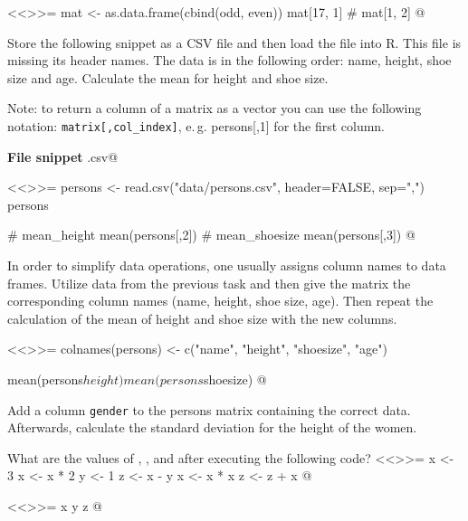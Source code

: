 \documentclass
[answers]
{exercise_sheet}
\begin{document}
\makeatletter\if@answers\begin{Answer}{1}
<<>>=
mat <- as.data.frame(cbind(odd, even))
mat[17, 1] # 
mat[1, 2]
@
\end{Answer}\fi\makeatother


\begin{Question}{3}
Store the following snippet as a CSV file and then load the file into R. This file is missing its header names. The data is in the following order: name, height, shoe size and age. Calculate the mean for height and shoe size. 

Note: to return a column of a matrix as a vector you can use the following notation: \verb|matrix[,col_index]|, e.\,g. persons[,1] for the first column.

\vspace*{0.5cm}
\textbf{File snippet} \verb@persons.csv@

\end{Question}

\makeatletter\if@answers\begin{Answer}{4}
<<>>=
persons <- read.csv("data/persons.csv", header=FALSE, sep=",")
persons

# mean_height
mean(persons[,2])
# mean_shoesize
mean(persons[,3])
@
\end{Answer}\fi\makeatother

\begin{Question}{2}
In order to simplify data operations, one usually assigns column names to data frames. Utilize data from the previous task and then give the matrix the corresponding column names (name, height, shoe size, age). Then repeat the calculation of the mean of height and shoe size with the new columns.
\end{Question}

\makeatletter\if@answers\begin{Answer}{4}
<<>>=
colnames(persons) <- c("name", "height", "shoesize", "age")

mean(persons$height)
mean(persons$shoesize)
@
\end{Answer}\fi\makeatother

\begin{Question}{2}
Add a column \verb|gender| to the persons matrix containing the correct data. Afterwards, calculate the standard deviation for the height of the women.
\end{Question}

\makeatletter\if@answers{}\fi\makeatother

\begin{Question}{1}
What are the values of \verb@x@, \verb@y@, and \verb@z@ after executing the following code?
<<>>=
x <- 3
x <- x * 2
y <- 1
z <- x - y
x <- x * x
z <- z + x
@ 
\end{Question}

\makeatletter\if@answers\begin{Answer}{1}
<<>>=
x
y
z
@
\end{Answer}\fi\makeatother
\end{document}
